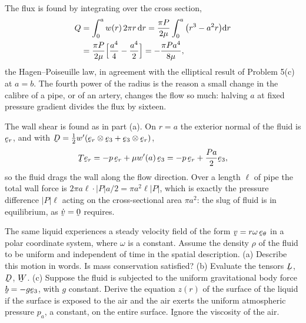 \begin{solution}
The flux is found by integrating over the cross section,
\[
\begin{aligned}
   Q&=\int_{0}^{a}w(r)\,2\pi r\,\mathrm{d} r
   =\frac{\pi P}{2\mu}\int_{0}^{a}\big(r^{3}-a^{2}r\big)\mathrm{d} r\\
   &=\frac{\pi P}{2\mu}\Big[\frac{a^{4}}{4}-\frac{a^{4}}{2}\Big]
   =-\frac{\pi P a^{4}}{8\mu},
\end{aligned}
\]
the Hagen--Poiseuille law, in agreement with the elliptical result of
Problem 5(c) at $a=b$. The fourth power of the radius is the reason a
small change in the calibre of a pipe, or of an artery, changes the flow
so much: halving $a$ at fixed pressure gradient divides the flux by
sixteen.

The wall shear is found as in part (a). On $r=a$ the exterior normal of
the fluid is $\ber$, and with $\bD=\tfrac12w'(\ber\otimes\be_{3}
+\be_{3}\otimes\ber)$,
\[
   \bT\ber=-p\,\ber+\mu w'(a)\,\be_{3}
   =-p\,\ber+\frac{Pa}{2}\be_{3},
\]
so the fluid drags the wall along the flow direction. Over a length
$\ell$ of pipe the total wall force is $2\pi a\ell\cdot|P|a/2
=\pi a^{2}\ell|P|$, which is exactly the pressure difference $|P|\ell$
acting on the cross-sectional area $\pi a^{2}$: the slug of fluid is in
equilibrium, as $\dot\bv=\bze$ requires.
\end{solution}
\begin{problem}
The same liquid experiences a steady velocity field of the form
$\bv=r\omega\,\bet$ in a polar coordinate system, where $\omega$ is a
constant. Assume the density $\rho$ of the fluid to be uniform and
independent of time in the spatial description.
(a) Describe this motion in words. Is mass conservation satisfied?
(b) Evaluate the tensors $\bL$, $\bD$, $\bW$.
(c) Suppose the fluid is subjected to the uniform gravitational body
force $\bb=-g\be_{3}$, with $g$ constant. Derive the equation $z(r)$ of
the surface of the liquid if the surface is exposed to the air and the
air exerts the uniform atmospheric pressure $p_{a}$, a constant, on the
entire surface. Ignore the viscosity of the air.
\end{problem}


